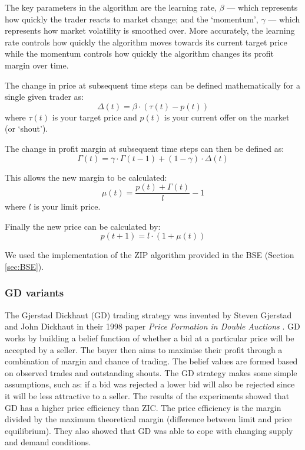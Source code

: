 \documentclass[preprint]{acm_proc_article-sp} %
\begin{document}
The key parameters in the algorithm are the learning rate, $\beta$ --- which represents how quickly the trader reacts to market change; and the `momentum', $\gamma$ --- which represents how market 
volatility is smoothed over. More accurately, the learning rate controls how quickly the algorithm 
moves towards its current target price while the momentum controls how quickly the algorithm changes 
its profit margin over time.

The change in price at subsequent time steps can be defined mathematically for a single given trader as:
\begin{equation}
    \Delta(t) = \beta \cdot ( \tau(t) - p(t))
    \label{eqn:change_in_price}
\end{equation}
where $\tau(t)$ is your target price and $p(t)$ is your current offer on the market (or `shout').

The change in profit margin at subsequent time steps can then be defined as:
\begin{equation}
    \Gamma(t) = \gamma \cdot \Gamma(t-1) + (1 - \gamma) \cdot \Delta(t)
    \label{eqn:change_in_margin}
\end{equation}

This allows the new margin to be calculated:
\begin{equation}
    \mu(t) = \frac{p(t) + \Gamma(t)}{l} - 1
    \label{eqn:new_margin}
\end{equation}
where $l$ is your limit price.

Finally the new price can be calculated by:
\begin{equation}
    p(t+1) = l \cdot (1 + \mu(t))
    \label{eqn:new_price}
\end{equation}

We used the implementation of the ZIP algorithm provided in the BSE (Section \ref{sec:BSE}).\\



\subsubsection{GD variants} \label{sec:traders_GDV}

The Gjerstad Dickhaut (GD) trading strategy was invented by Steven Gjerstad and John Dickhaut in their 1998 paper \emph{Price Formation in Double
Auctions} \cite{gd}.
GD works by building a belief function of whether a bid at a particular price
will be accepted by a seller.
The buyer then aims to maximise their profit through a combination of margin
and chance of trading.
The belief values are formed based on observed trades and outstanding shouts.
The GD strategy makes some simple assumptions, such as: if a bid was rejected a
lower bid will also be rejected since it will be less attractive to a seller.
The results of the experiments showed that GD has a higher price efficiency than ZIC.
The price efficiency is the margin divided by the maximum theoretical margin
(difference between limit and price equilibrium).
They also showed that GD was able to cope with changing supply and demand
conditions.
\end{document}
